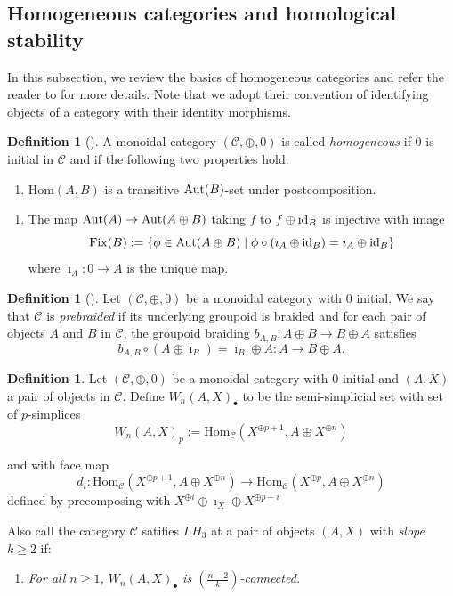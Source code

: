\documentclass[11pt, a4paper]{amsart}
\theoremstyle{definition}
\newtheorem{defn}[thm]{Definition} %
\newcommand{\CC}{{\mathcal {C}}}
\newcommand{\Hom}{{\mathrm{Hom}}} \renewcommand{\Im}{{\mathrm{Im}}}
\newcommand{\id}{{{\rm id}}}
\DeclareMathOperator{\Fix}{Fix}
\newenvironment{inlinecond}[1]{%
\begin{enumerate}%
\renewcommand*{\theenumi}{#1}%
\renewcommand*{\labelenumi}{#1}%
\item%
}{%
\end{enumerate}%
}
\begin{document}

\subsection{Homogeneous categories and homological stability}

In this subsection, we review the basics of homogeneous categories and refer the reader to \cite{RWW17} for more details. Note that we adopt their convention of identifying objects of a category with their identity morphisms.

\begin{defn}[{\cite[Definition 1.3]{RWW17}}]
A monoidal category $(\mathcal{C}, \oplus, 0)$ is called \emph{homogeneous} if $0$ is initial in $\mathcal{C}$ and if the following two properties hold.
\begin{inlinecond}{\textbf{H1}} $\Hom(A,B)$ is a transitive ${\mathrm{Aut}}(B)$-set under postcomposition.\end{inlinecond}
\begin{inlinecond}{\textbf{H2}} The map ${\mathrm{Aut}}(A) \rightarrow {\mathrm{Aut}}(A \oplus B)$ taking $f$ to $f \oplus \id_B$ is injective with image
\[\Fix(B) := \{ \phi\in \Aut(A\oplus B) \mid \phi\circ (\imath_A\oplus \id_B) = \imath_A \oplus \id_B\}\]
where $\imath_A\colon 0 \to A$ is the unique map.\end{inlinecond}
\end{defn}


\begin{defn}[{\cite[Definition 1.5]{RWW17}}]
Let $(\mathcal{C}, \oplus, 0)$ be a monoidal category with $0$ initial. We say that $\CC$ is \emph{prebraided} if its underlying groupoid is braided and for each pair of objects $A$ and $B$ in $\CC$, the groupoid braiding $b_{A,B} :A \oplus B \to B\oplus A$ satisfies 
$$ b_{A,B} \circ (A\oplus \imath_B) = \imath_B\oplus A : A\to B\oplus A.$$
\end{defn}




\begin{defn} \cite[Definition 2.1]{RWW17}
Let $(\CC,\oplus,0)$ be a monoidal category with $0$ initial  and $(A,X)$ a pair of objects in $\CC$. Define $W_n(A,X)_\bullet$ to be the semi-simplicial set with set of $p$-simplices
\[ W_n(A,X)_p := \Hom_\CC(X^{\oplus p+1}, A\oplus X^{\oplus n})\]

and with face map
$$d_i : \Hom_\CC(X^{\oplus p+1}, A \oplus X^{\oplus n}) \to \Hom_\CC (X^{\oplus p}, A \oplus X^{\oplus n}) $$
defined by precomposing with $X^{\oplus i} \oplus \imath_X \oplus X^{\oplus p-i}$

Also call the category $\mathcal{C}$ satifies $LH_3$ at a pair of objects $(A,X)$ with \emph{slope} $k\ge2$ if:  
\begin{inlinecond}{\textbf{LH3}}\label{cond:H3}
\textit{For all $n \geq 1$, $W_n(A,X)_\bullet$ is $(\frac{n-2}{k})$-connected.}\end{inlinecond}
\end{defn}
\end{document}
